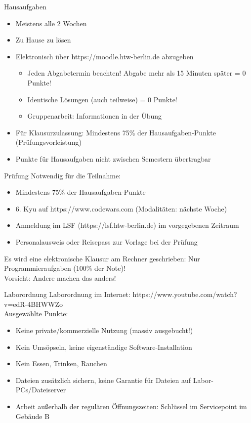 \documentclass[t]{beamer}
\begin{document}
\begin{frame}{Hausaufgaben}
	\begin{itemize}
		\item Meistens alle 2 Wochen
		\item Zu Hause zu lösen
		\item Elektronisch über https://moodle.htw-berlin.de abzugeben
		\begin{itemize}
			\item Jeden Abgabetermin beachten! Abgabe mehr als 15 Minuten später = 0 Punkte!
			\item Identische Lösungen (auch teilweise) = 0 Punkte!
			\item Gruppenarbeit: Informationen in der Übung
		\end{itemize}
		\item Für Klausurzulassung: Mindestens 75\% der Hausaufgaben-Punkte (Prüfungsvorleistung)
		\item Punkte für Hausaufgaben nicht zwischen Semestern übertragbar
	\end{itemize}
\end{frame}

\begin{frame}{Prüfung}
	Notwendig für die Teilnahme:
	\begin{itemize}
		\item Mindestens 75\% der Hausaufgaben-Punkte
		\item 6. Kyu auf https://www.codewars.com (Modalitäten: nächste Woche)
		\item Anmeldung im LSF (https://lsf.htw-berlin.de) im vorgegebenen Zeitraum
		\item Personalausweis oder Reisepass zur Vorlage bei der Prüfung
	\end{itemize}
	Es wird eine elektronische Klausur am Rechner geschrieben: Nur Programmieraufgaben (100\% der Note)!\\
	Vorsicht: Andere machen das anders!
\end{frame}

\begin{frame}{Laborordnung}
	Laborordnung im Internet: https://www.youtube.com/watch?v=edR-4BHWWZo\\
	Ausgewählte Punkte:
	\begin{itemize}
		\item Keine private/kommerzielle Nutzung (massiv ausgebucht!)
		\item Kein Umsöpseln, keine eigenständige Software-Installation
		\item Kein Essen, Trinken, Rauchen
		\item Dateien zusätzlich sichern, keine Garantie für Dateien auf Labor-PCs/Dateiserver
		\item Arbeit außerhalb der regulären Öffnungszeiten: Schlüssel im Servicepoint im Gebäude B
	\end{itemize}
\end{frame}
\end{document}
